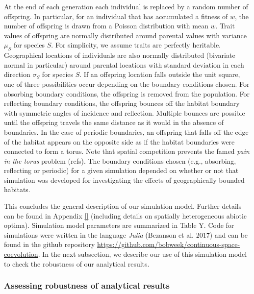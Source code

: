 \documentclass{article}
\begin{document}
At the end of each generation each individual is replaced by a random
number of offspring. In particular, for an individual that has
accumulated a fitness of \(w\), the number of offspring is drawn from a
Poisson distribution with mean \(w\). Trait values of offspring are
normally distributed around parental values with variance \(\mu_S\) for
species \(S\). For simplicity, we assume traits are perfectly heritable.
Geographical locations of individuals are also normally distributed
(bivariate normal in particular) around parental locations with standard
deviation in each direction \(\sigma_S\) for species \(S\). If an
offspring location falls outside the unit square, one of three
possibilities occur depending on the boundary conditions chosen. For
absorbing boundary conditions, the offspring is removed from the
population. For reflecting boundary conditions, the offspring bounces
off the habitat boundary with symmetric angles of incidence and
reflection. Multiple bounces are possible until the offspring travels
the same distance as it would in the absence of boundaries. In the case
of periodic boundaries, an offspring that falls off the edge of the
habitat appears on the opposite side as if the habitat boundaries were
connected to form a torus. Note that spatial competition prevents the
famed \emph{pain in the torus} problem (refs). The boundary conditions
chosen (e.g., absorbing, reflecting or periodic) for a given simulation
depended on whether or not that simulation was developed for
investigating the effects of geographically bounded habitats.

This concludes the general description of our simulation model. Further
details can be found in Appendix \ref{} (including details on spatially
heterogeneous abiotic optima). Simulation model parameters are
summarized in Table Y. Code for simulations were written in the language
\emph{Julia} (Bezanson et al. 2017) and can be found in the github
repository
\url{https://github.com/bobweek/continuous-space-coevolution}. In the
next subsection, we describe our use of this simulation model to check
the robustness of our analytical results.

\hypertarget{assessing-robustness-of-analytical-results}{%
\subsubsection{Assessing robustness of analytical
results}\label{assessing-robustness-of-analytical-results}}
\end{document}
